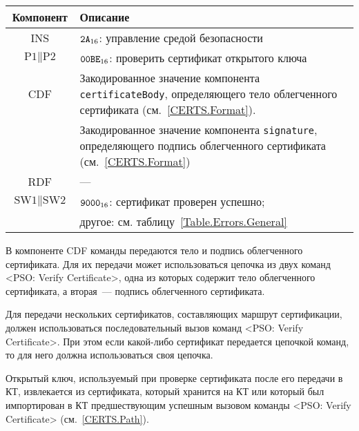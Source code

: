 \begin{table}[hbt]
\caption{}\label{Table.Oper.VerifyCertCmd}
\begin{tabular}{|c|p{14cm}|}
\hline
Компонент & Описание\\ 
\hline
\hline
INS & $\texttt{2A}_{16}$: управление средой безопасности \\
\hline
$\text{P1} \parallel \text{P2}$ & $\texttt{00BE}_{16}$: проверить 
сертификат открытого ключа \\ 
\hline
CDF  & Закодированное значение компонента \verb|certificateBody|, определяющего тело 
облегченного сертификата (см.~\ref{CERTS.Format}).\\
 & Закодированное значение компонента \verb|signature|, определяющего подпись 
облегченного сертификата (см.~\ref{CERTS.Format})\\
\hline 
RDF &  --- \\
\hline
$\text{SW1} \parallel \text{SW2}$ & $\texttt{9000}_{16}$: сертификат проверен успешно; \\
 & другое: см. таблицу~\ref{Table.Errors.General} \\
\hline
\end{tabular}
\end{table}

В компоненте CDF команды передаются тело и подпись облегченного сертификата.
Для их передачи может использоваться цепочка из двух команд 
<PSO: Verify Certificate>, одна из которых содержит тело 
облегченного сертификата, 
а вторая~--- подпись облегченного сертификата.

Для передачи нескольких сертификатов, составляющих маршрут 
сертификации, должен использоваться 
последовательный вызов команд <PSO: Verify Certificate>. 
При этом если какой-либо сертификат передается цепочкой команд, 
то для него должна использоваться своя цепочка.

Открытый ключ, используемый при проверке сертификата после его передачи в
КТ, извлекается из сертификата, который хранится на КТ или который был 
импортирован в КТ предшествующим успешным вызовом 
команды <PSO: Verify Certificate> (см.~\ref{CERTS.Path}).


